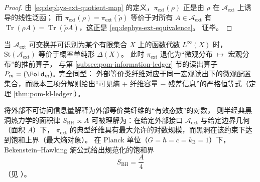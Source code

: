\begin{proof}
由 \eqref{eq:dephys-ext-quotient-map} 的定义，\(\pi_{\mathrm{ext}}(\rho)\) 正是由 \(\rho\) 在 \(\mathcal{A}_{\mathrm{ext}}\) 上诱导的线性泛函；
而 \(\pi_{\mathrm{ext}}(\rho)=\pi_{\mathrm{ext}}(\tilde\rho)\) 等价于对所有 \(A\in\mathcal{A}_{\mathrm{ext}}\) 有
\(\operatorname{Tr}(\rho A)=\operatorname{Tr}(\tilde\rho A)\)，这正是 \eqref{eq:dephys-ext-equivalence}。
证毕。
\end{proof}

\begin{remark}\label{rem:dephys-ext-quotient-as-pushforward}
当 \(\mathcal{A}_{\mathrm{ext}}\) 可交换并可识别为某个有限集合 \(X\) 上的函数代数 \(L^\infty(X)\) 时，
\(\mathrm{St}(\mathcal{A}_{\mathrm{ext}})\) 等价于概率单纯形 \(\Delta(X)\)。
此时 \(\pi_{\mathrm{ext}}\) 退化为“微观分布 \(\mapsto\) 宏观分布”的推前算子，
与第 \ref{subsec:pom-information-ledger} 节的读出算子 \(P_m=(\Fold_m)_*\) 完全同型：
外部等价类纤维对应于同一宏观读出下的微观配置集合，而账本三项分解则给出“可见熵 + 纤维容量 \(-\) 残差信息”的严格恒等式（定理 \ref{thm:pom-kl-ledger}）。
\end{remark}

\begin{proposition}\label{prop:dephys-horizon-fiber-capacity-area-law}
将外部不可访问信息量解释为外部等价类纤维的“有效态数”的对数，
则半经典黑洞热力学的面积律
\(
S_{\mathrm{BH}}\propto A
\)
可被理解为：在给定外部接口 \(\mathcal{A}_{\mathrm{ext}}\) 与给定边界几何（面积 \(A\)）下，
\(\pi_{\mathrm{ext}}\) 的典型纤维具有最大允许的对数规模，而黑洞在该约束下达到饱和上界（最大熵对象）。
在 Planck 单位（\(G=\hbar=c=k_{\mathrm B}=1\)）下，
Bekenstein--Hawking 熵公式给出规范化的饱和界
\begin{equation}\label{eq:dephys-bh-entropy-area-quarter}
\boxed{\;
S_{\mathrm{BH}}=\frac{A}{4}\;}
\end{equation}
（见 \cite{Bekenstein1973BlackHolesEntropy,Hawking1975ParticleCreation}）。
\end{proposition}

